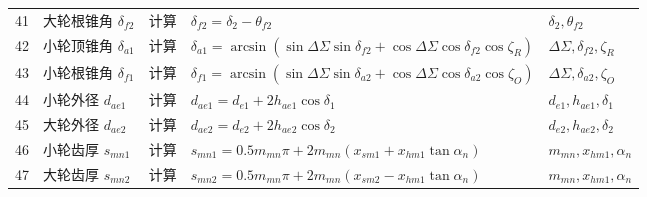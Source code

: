 ﻿\documentclass{article}
\begin{document}
\begin{table}[htbp]
\begin{tabular}{@{}cp{2.3cm}p{1.2cm}p{6cm}p{4cm}@{}}
41 & 大轮根锥角 $\delta_{f2}$ & 计算 & $\delta_{f2} = \delta_2 - \theta_{f2}$ & $\delta_2, \theta_{f2}$ \\
42 & 小轮顶锥角 $\delta_{a1}$ & 计算 & $\delta_{a1} = \arcsin(\sin\Delta\Sigma\sin\delta_{f2} + \cos\Delta\Sigma\cos\delta_{f2}\cos\zeta_R)$ & $\Delta\Sigma, \delta_{f2}, \zeta_R$ \\
43 & 小轮根锥角 $\delta_{f1}$ & 计算 & $\delta_{f1} = \arcsin(\sin\Delta\Sigma\sin\delta_{a2} + \cos\Delta\Sigma\cos\delta_{a2}\cos\zeta_O)$ & $\Delta\Sigma, \delta_{a2}, \zeta_O$ \\
\midrule
44 & 小轮外径 $d_{ae1}$ & 计算 & $d_{ae1} = d_{e1} + 2h_{ae1}\cos\delta_1$ & $d_{e1}, h_{ae1}, \delta_1$ \\
45 & 大轮外径 $d_{ae2}$ & 计算 & $d_{ae2} = d_{e2} + 2h_{ae2}\cos\delta_2$ & $d_{e2}, h_{ae2}, \delta_2$ \\
\midrule
46 & 小轮齿厚 $s_{mn1}$ & 计算 & $s_{mn1} = 0.5m_{mn}\pi + 2m_{mn}(x_{sm1} + x_{hm1}\tan\alpha_n)$ & $m_{mn}, x_{hm1}, \alpha_n$ \\
47 & 大轮齿厚 $s_{mn2}$ & 计算 & $s_{mn2} = 0.5m_{mn}\pi + 2m_{mn}(x_{sm2} - x_{hm1}\tan\alpha_n)$ & $m_{mn}, x_{hm1}, \alpha_n$ \\
\bottomrule
\end{tabular}
\end{table}
\end{document}
